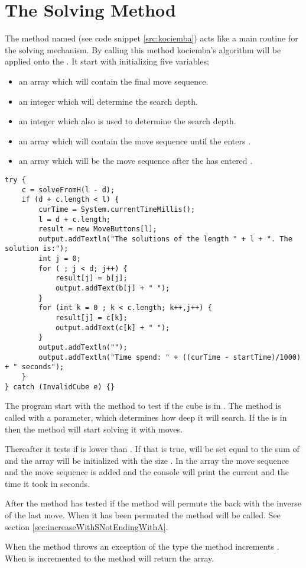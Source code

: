 \section{The Solving Method}
\label{sec:kSolve}
The method named  (see code snippet \ref{src:kociemba}) acts like a main routine for the solving mechanism. By calling this method kociemba's algorithm will be applied onto the \rubik{}. 
It start with initializing five variables; 
\begin{itemize}
\item an array  which will contain the final move sequence.
\item an integer  which will determine the search depth. 
\item an integer  which also is used to determine the search depth.
\item an array  which will contain the move sequence until the \rubik{} enters .
\item an array  which will be the move sequence after the \rubik{} has entered .
\end{itemize}


\begin{lstlisting}[style=sourceCode, caption=\myCaption{Key point in the solve method of kociemba's optimal solver}, label=src:kociemba]
try {
	c = solveFromH(l - d);
	if (d + c.length < l) {
		curTime = System.currentTimeMillis();
		l = d + c.length;
		result = new MoveButtons[l];
		output.addTextln("The solutions of the length " + l + ". The solution is:");
		int j = 0;
		for ( ; j < d; j++) {
			result[j] = b[j];
			output.addText(b[j] + " ");
		}
		for (int k = 0 ; k < c.length; k++,j++) {
			result[j] = c[k];
			output.addText(c[k] + " ");
		}
		output.addTextln("");
		output.addTextln("Time spend: " + ((curTime - startTime)/1000) + " seconds");
	}
} catch (InvalidCube e) {}
\end{lstlisting}

The program start with the  method to test if the cube is in . The method  is called with a parameter, which determines how deep it will search. If the \rubik{} is in  then the method will start solving it with  moves.

Thereafter it tests if  is lower than . 
If that is true,  will be set equal to the sum of  and the  array will be initialized with the size . 
In the  array the move sequence  and the move sequence  is added and the console will print the current  and the time it took in seconds.

After the method has tested if  the method will permute the \rubik{} back with the inverse of the last move. When it has been permuted the method  will be called. See section \ref{sec:increaseWithSNotEndingWithA}.

When the method  throws an exception of the type  the method increments . 
When  is incremented to  the method will return the  array.